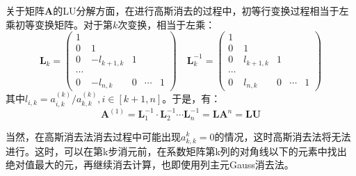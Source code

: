 \documentclass[12pt, onecolumn]{article}
\newcommand\normf{\fangsong}
\begin{document}
	关于矩阵$\boldsymbol{A}$的LU分解方面，在进行高斯消去的过程中，初等行变换过程相当于左乘初等变换矩阵。对于第$k$次变换，相当于左乘：
	\begin{equation}
	\boldsymbol{L}_k=\begin{pmatrix}
	1\\
	0&1\\
	0&-l_{k+1,k}&1\\
	\cdots\\
	0&-l_{n,k}&0&\cdots&1
	\end{pmatrix}
	\quad
	\boldsymbol{L}_k^{-1}=\begin{pmatrix}
		1\\
		0&1\\
		0&l_{k+1,k}&1\\
		\cdots\\
		0&l_{n,k}&0&\cdots&1
		\end{pmatrix}
	\end{equation}
	其中$l_{i,k}=a^{(k)}_{i,k}/a^{(k)}_{k,k},i\in[k+1,n]$。于是，有：
	\begin{equation}
	\boldsymbol{A}^{(1)}=\boldsymbol{L}_1^{-1}\cdot\boldsymbol{L}_2^{-1}\cdots
	\boldsymbol{L}_n^{-1}=\boldsymbol{L}\boldsymbol{A}^{n}=\boldsymbol{LU}
	\end{equation}
	
	当然，在高斯消去法消去过程中可能出现$a_{k,k}^{k}=0$的情况，这时高斯消去法将无法进行。这时，可以在第k步消元前，在系数矩阵第k列的对角线以下的元素中找出绝对值最大的元，再继续消去计算，也即使用列主元Gauss消去法。
	
	
	\subsection{\normf{实验结果}}
\end{document}
